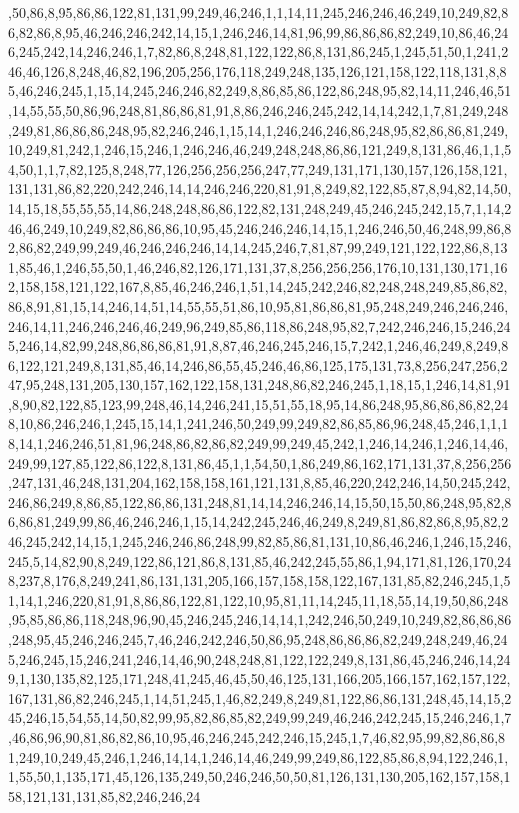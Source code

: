 ,50,86,8,95,86,86,122,81,131,99,249,46,246,1,1,14,11,245,246,246,46,249,10,249,82,86,82,86,8,95,46,246,246,242,14,15,1,246,246,14,81,96,99,86,86,86,82,249,10,86,46,246,245,242,14,246,246,1,7,82,86,8,248,81,122,122,86,8,131,86,245,1,245,51,50,1,241,246,46,126,8,248,46,82,196,205,256,176,118,249,248,135,126,121,158,122,118,131,8,85,46,246,245,1,15,14,245,246,246,82,249,8,86,85,86,122,86,248,95,82,14,11,246,46,51,14,55,55,50,86,96,248,81,86,86,81,91,8,86,246,246,245,242,14,14,242,1,7,81,249,248,249,81,86,86,86,248,95,82,246,246,1,15,14,1,246,246,246,86,248,95,82,86,86,81,249,10,249,81,242,1,246,15,246,1,246,246,46,249,248,248,86,86,121,249,8,131,86,46,1,1,54,50,1,1,7,82,125,8,248,77,126,256,256,256,247,77,249,131,171,130,157,126,158,121,131,131,86,82,220,242,246,14,14,246,246,220,81,91,8,249,82,122,85,87,8,94,82,14,50,14,15,18,55,55,55,14,86,248,248,86,86,122,82,131,248,249,45,246,245,242,15,7,1,14,246,46,249,10,249,82,86,86,86,10,95,45,246,246,246,14,15,1,246,246,50,46,248,99,86,82,86,82,249,99,249,46,246,246,246,14,14,245,246,7,81,87,99,249,121,122,122,86,8,131,85,46,1,246,55,50,1,46,246,82,126,171,131,37,8,256,256,256,176,10,131,130,171,162,158,158,121,122,167,8,85,46,246,246,1,51,14,245,242,246,82,248,248,249,85,86,82,86,8,91,81,15,14,246,14,51,14,55,55,51,86,10,95,81,86,86,81,95,248,249,246,246,246,246,14,11,246,246,246,46,249,96,249,85,86,118,86,248,95,82,7,242,246,246,15,246,245,246,14,82,99,248,86,86,86,81,91,8,87,46,246,245,246,15,7,242,1,246,46,249,8,249,86,122,121,249,8,131,85,46,14,246,86,55,45,246,46,86,125,175,131,73,8,256,247,256,247,95,248,131,205,130,157,162,122,158,131,248,86,82,246,245,1,18,15,1,246,14,81,91,8,90,82,122,85,123,99,248,46,14,246,241,15,51,55,18,95,14,86,248,95,86,86,86,82,248,10,86,246,246,1,245,15,14,1,241,246,50,249,99,249,82,86,85,86,96,248,45,246,1,1,18,14,1,246,246,51,81,96,248,86,82,86,82,249,99,249,45,242,1,246,14,246,1,246,14,46,249,99,127,85,122,86,122,8,131,86,45,1,1,54,50,1,86,249,86,162,171,131,37,8,256,256,247,131,46,248,131,204,162,158,158,161,121,131,8,85,46,220,242,246,14,50,245,242,246,86,249,8,86,85,122,86,86,131,248,81,14,14,246,246,14,15,50,15,50,86,248,95,82,86,86,81,249,99,86,46,246,246,1,15,14,242,245,246,46,249,8,249,81,86,82,86,8,95,82,246,245,242,14,15,1,245,246,246,86,248,99,82,85,86,81,131,10,86,46,246,1,246,15,246,245,5,14,82,90,8,249,122,86,121,86,8,131,85,46,242,245,55,86,1,94,171,81,126,170,248,237,8,176,8,249,241,86,131,131,205,166,157,158,158,122,167,131,85,82,246,245,1,51,14,1,246,220,81,91,8,86,86,122,81,122,10,95,81,11,14,245,11,18,55,14,19,50,86,248,95,85,86,86,118,248,96,90,45,246,245,246,14,14,1,242,246,50,249,10,249,82,86,86,86,248,95,45,246,246,245,7,46,246,242,246,50,86,95,248,86,86,86,82,249,248,249,46,245,246,245,15,246,241,246,14,46,90,248,248,81,122,122,249,8,131,86,45,246,246,14,249,1,130,135,82,125,171,248,41,245,46,45,50,46,125,131,166,205,166,157,162,157,122,167,131,86,82,246,245,1,14,51,245,1,46,82,249,8,249,81,122,86,86,131,248,45,14,15,245,246,15,54,55,14,50,82,99,95,82,86,85,82,249,99,249,46,246,242,245,15,246,246,1,7,46,86,96,90,81,86,82,86,10,95,46,246,245,242,246,15,245,1,7,46,82,95,99,82,86,86,81,249,10,249,45,246,1,246,14,14,1,246,14,46,249,99,249,86,122,85,86,8,94,122,246,1,1,55,50,1,135,171,45,126,135,249,50,246,246,50,50,81,126,131,130,205,162,157,158,158,121,131,131,85,82,246,246,24
